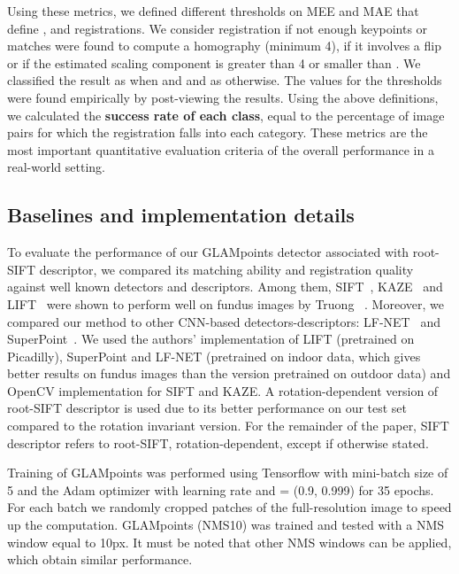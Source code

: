 \begin{enumerate}
Using these metrics, we defined different thresholds on MEE and MAE that define ,  and  registrations. We consider registration  if not enough keypoints or matches were found to compute a homography (minimum 4), if it involves a flip or if the estimated scaling component is greater than 4 or smaller than . We classified the result as  when  and  and as  otherwise. The values for the thresholds were found empirically by post-viewing the results. 
Using the above definitions, we calculated the \textbf{success rate of each class}, equal to the percentage of image pairs for which the registration falls into each category. These metrics are the most important quantitative evaluation criteria of the overall performance in a real-world setting.

\end{enumerate}

\subsection{Baselines and implementation details}

To evaluate the performance of our GLAMpoints detector associated with root-SIFT descriptor, we compared its matching ability and registration quality against well known detectors and descriptors. Among them, SIFT~\cite{sift}, KAZE~\cite{Alcantarilla2012} and LIFT~\cite{LIFT} were shown to perform well on fundus images by Truong \etal~\cite{truong}. Moreover, we compared our method to other CNN-based detectors-descriptors: \ac{LF-NET}~\cite{Trulls} and SuperPoint~\cite{Detone}. We used the authors' implementation of LIFT (pretrained on Picadilly), SuperPoint and \ac{LF-NET} (pretrained on indoor data, which gives better results on fundus images than the version pretrained on outdoor data) and OpenCV implementation for \ac{SIFT} and KAZE. A rotation-dependent version of root-\ac{SIFT} descriptor is used due to its better performance on our test set compared to the rotation invariant version. For the remainder of the paper, \ac{SIFT} descriptor refers to root-SIFT, rotation-dependent, except if otherwise stated.



Training of \ac{GLAMpoints} was performed using Tensorflow \cite{tensorflow2015-whitepaper} with mini-batch size of 5 and the Adam optimizer \cite{Kingma2015} with learning rate  and  = (0.9, 0.999) for 35 epochs. For each batch we randomly cropped  patches of the full-resolution image to speed up the computation. \ac{GLAMpoints} (NMS10) was trained and tested with a \ac{NMS} window  equal to 10px. It must be noted that other \ac{NMS} windows can be applied, which obtain similar performance.

